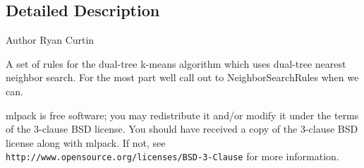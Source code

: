 \subsection{Detailed Description}
\begin{DoxyAuthor}{Author}
Ryan Curtin
\end{DoxyAuthor}
A set of rules for the dual-\/tree k-\/means algorithm which uses dual-\/tree nearest neighbor search. For the most part we\textquotesingle{}ll call out to Neighbor\+Search\+Rules when we can.

mlpack is free software; you may redistribute it and/or modify it under the terms of the 3-\/clause B\+SD license. You should have received a copy of the 3-\/clause B\+SD license along with mlpack. If not, see {\tt http\+://www.\+opensource.\+org/licenses/\+B\+S\+D-\/3-\/\+Clause} for more information. 